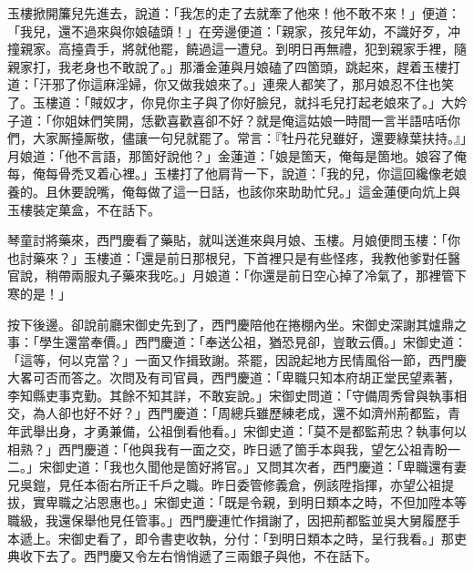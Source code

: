 玉樓掀開簾兒先進去，說道：「我怎的走了去就牽了他來！他不敢不來！」{}便道：「我兒，還不過來與你娘磕頭！」在旁邊便道：「親家，孩兒年幼，不識好歹，冲撞親家。高擡貴手，將就他罷，饒過這一遭兒。到明日再無禮，{}犯到親家手裡，隨親家打，我老身也不敢說了。」{}那潘金蓮與月娘磕了四箇頭，跳起來，趕着玉樓打道：「汗邪了你這麻淫婦，你又做我娘來了。」連衆人都笑了，那月娘忍不住也笑了。{}玉樓道：「賊奴才，你見你主子與了你好臉兒，就抖毛兒打起老娘來了。」大妗子道：「你姐妹們笑開，恁歡喜歡喜卻不好？就是俺這姑娘一時間一言半語咭咶你們，大家厮擡厮敬，儘讓一句兒就罷了。常言：『牡丹花兒雖好，還要綠葉扶持。』」月娘道：「他不言語，那箇好說他？」金蓮道：「娘是箇天，俺每是箇地。娘容了俺每，俺每骨禿叉着心裡。」玉樓打了他肩背一下，說道：「我的兒，你這回纔像老娘養的。且休要說嘴，俺每做了這一日話，也該你來助助忙兒。」這金蓮便向炕上與玉樓裝定菓盒，不在話下。

琴童討將藥來，西門慶看了藥貼，就叫送進來與月娘、玉樓。月娘便問玉樓：「你也討藥來？」玉樓道：「還是前日那根兒，下首裡只是有些怪疼，我教他爹對任醫官說，稍帶兩服丸子藥來我吃。」月娘道：「你還是前日空心掉了冷氣了，那裡管下寒的是！」

按下後邊。卻說前廳宋御史先到了，西門慶陪他在捲棚內坐。宋御史深謝其爐鼎之事：「學生還當奉價。」西門慶道：「奉送公祖，猶恐見卻，豈敢云價。」宋御史道：「這等，何以克當？」一面又作揖致謝。茶罷，因說起地方民情風俗一節，西門慶大畧可否而答之。次問及有司官員，{}西門慶道：「卑職只知本府胡正堂民望素著，李知縣吏事克勤。其餘不知其詳，不敢妄說。」宋御史問道：「守備周秀曾與執事相交，為人卻也好不好？」西門慶道：「周總兵雖歷練老成，還不如濟州荊都監，青年武舉出身，才勇兼備，公祖倒看他看。」宋御史道：「莫不是都監荊忠？執事何以相熟？」西門慶道：「他與我有一面之交，昨日遞了箇手本與我，望乞公祖青盼一二。」宋御史道：「我也久聞他是箇好將官。」又問其次者，西門慶道：「卑職還有妻兄吳鎧，見任本衙右所正千戶之職。昨日委管修義倉，例該陞指揮，亦望公祖提拔，實卑職之沾恩惠也。」宋御史道：「既是令親，到明日類本之時，不但加陞本等職級，我還保舉他見任管事。」西門慶連忙作揖謝了，因把荊都監並吳大舅履歷手本遞上。宋御史看了，即令書吏收執，分付：「到明日類本之時，呈行我看。」那吏典收下去了。西門慶又令左右悄悄遞了三兩銀子與他，不在話下。

